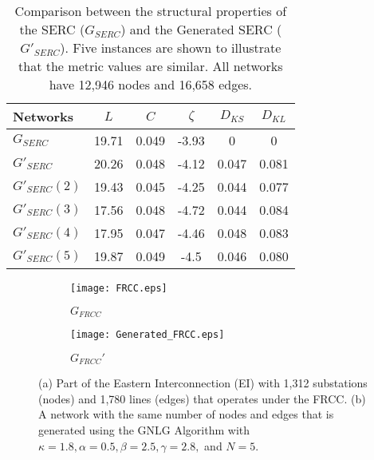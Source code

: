 \documentclass[10pt,journal]{IEEEtran}
\begin{document}
\begin{table}[t]
\centering
\vspace*{-.1cm}
\caption{Comparison between the structural properties of the SERC ($G_{SERC}$) and the Generated SERC ($G'_{SERC}$). Five instances are shown to illustrate that the metric values are similar. All networks have 12,946 nodes and 16,658 edges.}
\vspace*{-0.2cm}
\footnotesize
\begin{tabular}{|l|c|c|c|c|c|}
\hline
Networks& $L$&$C$& $\zeta$  & $D_{KS}$& $D_{KL}$\\
\hline
$G_{SERC}$ & 19.71 &0.049 & -3.93 & 0&0\\
\hline
$G'_{SERC}$ & 20.26 & 0.048 & -4.12 &0.047& 0.081\\
\hline
$G'_{SERC} (2)$ & 19.43 & 0.045 & -4.25 &0.044& 0.077\\
\hline
$G'_{SERC} (3)$ & 17.56 & 0.048 & -4.72 &0.044& 0.084\\
\hline
$G'_{SERC} (4)$ & 17.95 & 0.047 & -4.46 &0.048& 0.083\\
\hline
$G'_{SERC} (5)$ & 19.87 & 0.049 & -4.5 & 0.046&0.080\\
\hline
\end{tabular}
\label{tb:summary_SERC}
\end{table}
\normalsize
\begin{figure}[t]
\centering
\begin{subfigure}[b]{0.24\textwidth}
\vspace*{-0.2cm}
\texttt{[image: FRCC.eps]}
\caption{$G_{FRCC}$}
\vspace*{0.2cm}
\end{subfigure}
\begin{subfigure}[b]{0.24\textwidth}
\vspace*{-0.2cm}
\texttt{[image: Generated\_FRCC.eps]}
\caption{$G_{FRCC}'$}
\vspace*{0.2cm}
\end{subfigure}
\vspace{-0.4cm}
\caption{(a) Part of the  Eastern Interconnection (EI)  with  1,312 substations (nodes) and 1,780 lines (edges) that operates under the FRCC. (b) A network with the same number of nodes and edges that is generated using the GNLG Algorithm with $\kappa=1.8, \alpha = 0.5, \beta = 2.5, \gamma = 2.8,$ and $N=5$.}
\label{fig:FRCC}
\end{figure}
\end{document}

